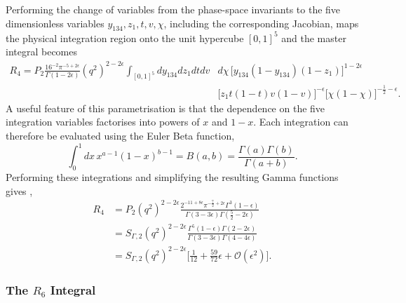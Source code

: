 Performing the change of variables from the phase-space invariants to the five dimensionless
variables $y_{134},z_1,t,v,\chi$, including the corresponding Jacobian, maps the physical
integration region onto the unit hypercube $[0,1]^5$ and the master integral becomes
\begin{equation}
    \begin{split}
        R_4 = P_2\frac{16^{-2}\pi^{-5+2\epsilon}}{\Gamma(1-2\epsilon)}\!\left(q^2\right)^{2-2\epsilon}\int_{[0,1]^5}dy_{134}dz_1dtdv&d\chi\,\Big[y_{134}(1-y_{134})(1-z_1)\Big]^{1-2\epsilon}\\
                                                                                                                                                  &\Big[z_1t(1-t)v(1-v)\Big]^{-\epsilon}\Big[\chi(1-\chi)\Big]^{-\frac12-\epsilon}.
    \end{split}
\end{equation}
A useful feature of this parametrisation is that the dependence on the five integration
variables factorises into powers of $x$ and $1-x$. Each integration can therefore be evaluated
using the Euler Beta function,
\begin{equation*}
    \int_0^1 dx\,x^{a-1}(1-x)^{b-1}=B(a,b)=\frac{\Gamma(a)\Gamma(b)}{\Gamma(a+b)}.
\end{equation*}
Performing these integrations and simplifying the resulting Gamma functions gives
\cite{Gehrmann-DeRidder:2005btv,GehrmannDeRidder0311276},
\begin{equation}
    \begin{split}
        R_4 &= P_2\!\left(q^2\right)^{2-2\epsilon}\frac{2^{-11+8\epsilon}\pi^{-\frac72+2\epsilon}\Gamma^3(1-\epsilon)}{\Gamma(3-3\epsilon)\Gamma\!\left(\frac52-2\epsilon\right)}\\
            &= S_{\Gamma,2}\!\left(q^2\right)^{2-2\epsilon}\frac{\Gamma^5(1-\epsilon)\Gamma(2-2\epsilon)}{\Gamma(3-3\epsilon)\Gamma(4-4\epsilon)}\\
            &= S_{\Gamma,2}\!\left(q^2\right)^{2-2\epsilon}\Bigg[\frac1{12}+\frac{59}{72}\epsilon+\mathcal O\!\left(\epsilon^2\right)\Bigg].
    \end{split}
\end{equation}

\subsubsection*{The $R_6$ Integral}

